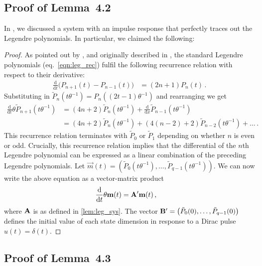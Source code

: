 \subsection{Proof of Lemma~4.2}
\label{app:leg_sys_proof}

In , we discussed a \LTI system with an impulse response that perfectly traces out the Legendre polynomials.
In particular, we claimed the following:

\LemLegSys*

\begin{proof}
As pointed out by \citet[Appendix B.1.1]{gu2020hippo}, and originally described in \citet[Chapter 12.2, p.~751]{arfken2005mathematical}, the standard Legendre polynomials (eq.~\ref{eqn:leg_rec}) fulfil the following recurrence relation with respect to their derivative:
\begin{align*}
	\frac{\mathrm{d}}{\mathrm{d}t} \big( P_{n + 1}(t) - P_{n - 1}(t) \big) &= (2n + 1) P_n(t) \,.
\end{align*}
Substituting in $\tilde P_n(t \theta^{-1}) = P_n((2t - 1) \theta^{-1})$ and rearranging we get
\begin{align*}
	\frac{\mathrm{d}}{\mathrm{d}t} \theta \tilde P_{n + 1}(t \theta^{-1})
		&= (4n + 2) \tilde P_n(t \theta^{-1}) + \frac{\mathrm{d}}{\mathrm{d}x} \tilde P_{n - 1}(t \theta^{-1}) \\
		&= (4n + 2) \tilde P_n(t \theta^{-1}) + (4(n - 2) + 2) \tilde P_{n - 2}(t \theta^{-1}) + \ldots \,.
\end{align*}
This recurrence relation terminates with $\tilde P_0$ or $\tilde P_1$ depending on whether $n$ is even or odd.
Crucially, this recurrence relation implies that the differential of the $n$th Legendre polynomial can be expressed as a linear combination of the preceding Legendre polynomials.
Let $\vec m(t) = (\tilde P_0(t \theta^{-1}), \ldots, \tilde P_{q - 1}(t \theta^{-1}))$. We can now write the above equation as a vector-matrix product
\begin{align*}
	\frac{\mathrm{d}}{\mathrm{d}t} \theta \mathbf{m}(t) &= {\mathbf{A}}' \mathbf{m}(t) \,,
\end{align*}
where ${\mathbf{A}}$ is as defined in \cref{lem:leg_sys}.
The vector ${\mathbf{B}}' = \big( \tilde P_0(0), \ldots, \tilde P_{q - 1}(0)\big)$ defines the initial value of each state dimension in response to a Dirac pulse $u(t) = \delta(t)$. \qedhere
\end{proof}

\subsection{Proof of Lemma~4.3}

